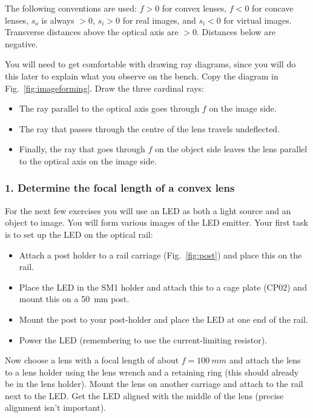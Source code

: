 \documentclass[a4paper]{report}
\begin{document}
The following conventions are used: $f>0$ for convex lenses, $f<0$ for concave lenses, $s_o$ is always $>0$, $s_i>0$ for real images, and $s_i<0$ for virtual images.
Transverse distances above the optical axis are $>0$. Distances below are negative. 

\vspace{2.5em}
You will need to get comfortable with drawing ray diagrams, since you will do this later to explain what you observe on the bench.
Copy the diagram in Fig.~\ref{fig:imageforming}.
Draw the three cardinal rays:
\begin{itemize}
\item The ray parallel to the optical axis goes through $f$ on the image side.
\item The ray that passes through the centre of the lens travels undeflected.
\item Finally, the ray that goes through $f$ on the object side leaves the lens parallel to the optical axis on the image side. 
\end{itemize}


\clearpage




\subsubsection{1. Determine the focal length of a convex lens }
For the next few exercises you will use an LED as both a light source and an object to image.
You will form various images of the LED emitter. 
Your first task is to set up the LED on the optical rail:

\begin{itemize}
\item Attach a post holder to a rail carriage (Fig.~\ref{fig:post}) and place this on the rail. 
\item Place the LED in the SM1 holder and attach this to a cage plate (CP02) and mount this on a 50~mm post. 
\item Mount the post to your post-holder and place the LED at one end of the rail.
\item Power the LED (remembering to use the current-limiting resistor). 
\end{itemize}


Now choose a lens with a focal length of about $f=100~mm$ and attach the lens to a lens holder using the lens wrench and a retaining ring (this should already be in the lens holder).
Mount the lens on another carriage and attach to the rail next to the LED. 
Get the LED aligned with the middle of the lens (precise alignment isn't important). 
\end{document}
